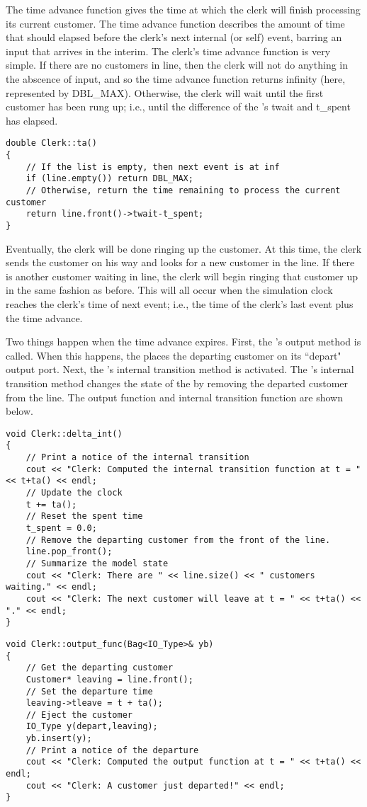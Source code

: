 The time advance function gives the time at which the clerk will finish processing its current customer.  The time advance function describes the amount of time that should elapsed before the clerk's next internal (or self) event, barring an input that arrives in the interim.  The clerk's time advance function is very simple. If there are no customers in line, then the clerk will not do anything in the abscence of input, and so the time advance function returns infinity (here, represented by DBL\_MAX). Otherwise, the clerk will wait until the first customer has been rung up; i.e., until the difference of the 's twait and t\_spent has elapsed.
\begin{verbatim}
double Clerk::ta()
{
    // If the list is empty, then next event is at inf
    if (line.empty()) return DBL_MAX;
    // Otherwise, return the time remaining to process the current customer
    return line.front()->twait-t_spent;
}
\end{verbatim}

Eventually, the clerk will be done ringing up the customer. At this
time, the clerk sends the customer on his way and looks for a new
customer in the line. If there is another customer waiting in line,
the clerk will begin ringing that customer up in the same fashion as
before. This will all occur when the simulation clock
reaches the clerk's time of next event; i.e., the time of the clerk's last event plus the time advance. 

Two things happen when the time advance expires.
First, the 's output method is called. When this
happens, the  places the departing customer on its
``depart" output port. Next, the 's internal
transition method is activated. The 's internal transition
method changes the state of the  by removing the departed
customer from the line.
The output function and
internal transition function are shown below.
\begin{verbatim}
void Clerk::delta_int()
{
    // Print a notice of the internal transition
    cout << "Clerk: Computed the internal transition function at t = " << t+ta() << endl;
    // Update the clock
    t += ta();
    // Reset the spent time 
    t_spent = 0.0;
    // Remove the departing customer from the front of the line.
    line.pop_front();
    // Summarize the model state
    cout << "Clerk: There are " << line.size() << " customers waiting." << endl;
    cout << "Clerk: The next customer will leave at t = " << t+ta() << "." << endl;
}
\end{verbatim}
\begin{verbatim}
void Clerk::output_func(Bag<IO_Type>& yb)
{
    // Get the departing customer
    Customer* leaving = line.front();
    // Set the departure time
    leaving->tleave = t + ta();
    // Eject the customer 
    IO_Type y(depart,leaving);
    yb.insert(y);
    // Print a notice of the departure
    cout << "Clerk: Computed the output function at t = " << t+ta() << endl;
    cout << "Clerk: A customer just departed!" << endl;
}
\end{verbatim}

